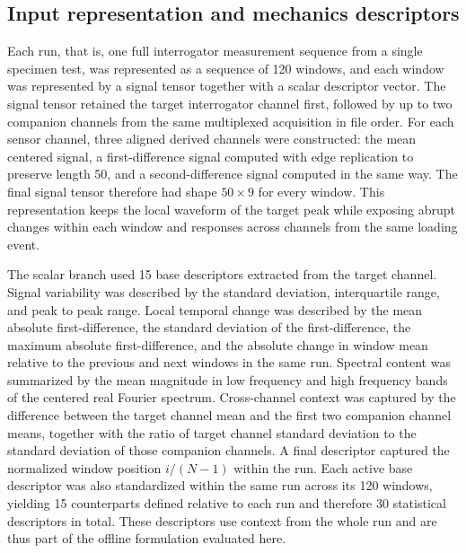 \documentclass[fleqn,10pt]{wlscirep}
\begin{document}
\FloatBarrier

\subsection*{Input representation and mechanics descriptors}

Each run, that is, one full interrogator measurement sequence from a single specimen test, was represented as a sequence of 120 windows, and each window was represented by a signal tensor together with a scalar descriptor vector. The signal tensor retained the target interrogator channel first, followed by up to two companion channels from the same multiplexed acquisition in file order. For each sensor channel, three aligned derived channels were constructed: the mean centered signal, a first-difference signal computed with edge replication to preserve length 50, and a second-difference signal computed in the same way. The final signal tensor therefore had shape $50\times9$ for every window. This representation keeps the local waveform of the target peak while exposing abrupt changes within each window and responses across channels from the same loading event.

The scalar branch used 15 base descriptors extracted from the target channel. Signal variability was described by the standard deviation, interquartile range, and peak to peak range. Local temporal change was described by the mean absolute first-difference, the standard deviation of the first-difference, the maximum absolute first-difference, and the absolute change in window mean relative to the previous and next windows in the same run. Spectral content was summarized by the mean magnitude in low frequency and high frequency bands of the centered real Fourier spectrum. Cross-channel context was captured by the difference between the target channel mean and the first two companion channel means, together with the ratio of target channel standard deviation to the standard deviation of those companion channels. A final descriptor captured the normalized window position $i/(N-1)$ within the run. Each active base descriptor was also standardized within the same run across its 120 windows, yielding 15 counterparts defined relative to each run and therefore 30 statistical descriptors in total. These descriptors use context from the whole run and are thus part of the offline formulation evaluated here.
\end{document}

